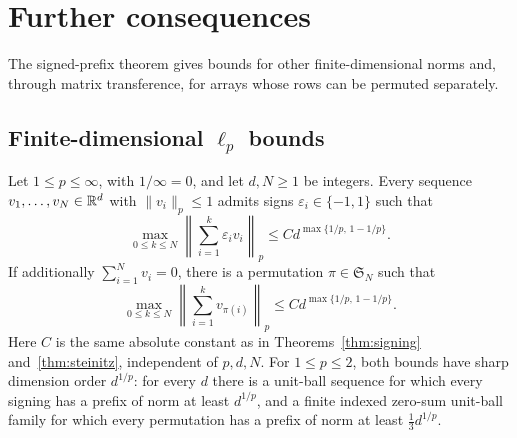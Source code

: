 \section{Further consequences}\label{sec:consequences}

The signed-prefix theorem gives bounds for other finite-dimensional norms
and, through matrix transference, for arrays whose rows can be permuted
separately.

\subsection{Finite-dimensional \texorpdfstring{$\ell_p$}{lp} bounds}

\begin{corollary}\label{cor:lp-steinitz}
Let $1\le p\le\infty$, with $1/\infty=0$, and let $d,N\ge1$ be integers.
Every sequence $v_1,\ldots,v_N\in\mathbb R^d$ with $\lVert v_i\rVert_p\le1$
admits signs $\varepsilon_i\in\{-1,1\}$ such that
\[
 \max_{0\le k\le N}
 \left\lVert\sum_{i=1}^k\varepsilon_i v_i\right\rVert_p
 \le C d^{\max\{1/p,\,1-1/p\}}.
\]
If additionally $\sum_{i=1}^N v_i=0$, there is a permutation
$\pi\in\mathfrak S_N$ such that
\[
 \max_{0\le k\le N}
 \left\lVert\sum_{i=1}^k v_{\pi(i)}\right\rVert_p
 \le C d^{\max\{1/p,\,1-1/p\}}.
\]
Here $C$ is the same absolute constant as in
Theorems~\ref{thm:signing} and~\ref{thm:steinitz}, independent of $p,d,N$.
For $1\le p\le2$, both bounds have sharp dimension order $d^{1/p}$:
for every $d$ there is a unit-ball sequence for which every signing has
a prefix of norm at least $d^{1/p}$, and a finite indexed zero-sum
unit-ball family for which every permutation has a prefix of norm at
least $\tfrac13d^{1/p}$.
\end{corollary}

